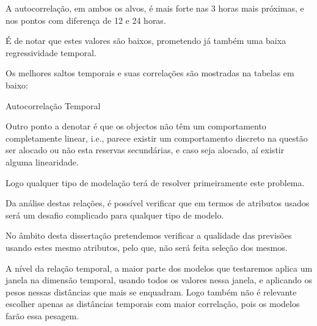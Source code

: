 A autocorrelação, em ambos os alvos, é mais forte nas 3 horas mais próximas, e nos pontos com diferença de 12 e 24 horas.\par
É de notar que estes valores são baixos, prometendo já também uma baixa regressividade temporal.\par
Os melhores saltos temporais e suas correlações são mostradas na tabelas em baixo:\\


\begin{table}[H]
  \caption{Autocorrelação Temporal}    
  \resizebox{\linewidth}{!}{}
  \label{tab:tempcorr}
  \end{table}

Outro ponto a denotar é que os objectos não têm um comportamento completamente linear, i.e., parece existir um comportamento discreto na questão ser alocado ou não esta reservas secundárias, e caso seja alocado, aí existir alguma linearidade.\par
Logo qualquer tipo de modelação terá de resolver primeiramente este problema.\par
Da análise destas relações, é possível verificar que em termos de atributos usados será um desafio complicado para qualquer tipo de modelo.\par
No âmbito desta dissertação pretendemos verificar a qualidade das previsões usando estes mesmo atributos, pelo que, não será feita seleção dos mesmos.\par
A nível da relação temporal, a maior parte dos modelos que testaremos aplica um janela na dimensão temporal, usando todos os valores nessa janela, e aplicando os pesos nessas distâncias que mais se enquadram. Logo também não é relevante escolher apenas as distâncias temporais com maior correlação, pois os modelos farão essa pesagem.\par


